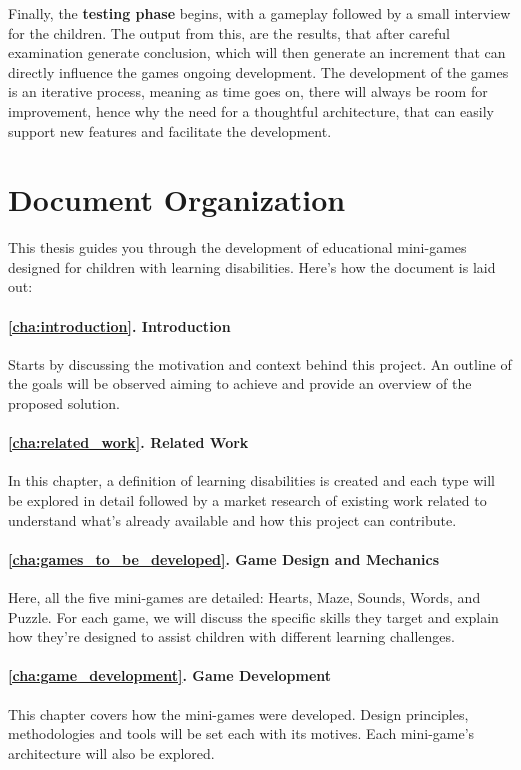 Finally, the \textbf{testing phase} begins, with a gameplay followed by a small interview for the children. The output from this, are the results, that after careful examination generate conclusion, which will then generate an increment that can directly influence the games ongoing development.
The development of the games is an iterative process, meaning as time goes on, there will always be room for improvement, hence why the need for a thoughtful architecture, that can easily support new features and facilitate the development.


\section{Document Organization}

This thesis guides you through the development of educational mini-games designed for children with learning disabilities. Here’s how the document is laid out:

\paragraph{\ref{cha:introduction}. Introduction} Starts by discussing the motivation and context behind this project. An outline of the goals will be observed aiming to achieve and provide an overview of the proposed solution.

\paragraph{\ref{cha:related_work}. Related Work} In this chapter, a definition of learning disabilities is created and each type will be explored in detail followed by a market research of existing work related to understand what’s already available and how this project can contribute.

\paragraph{\ref{cha:games_to_be_developed}. Game Design and Mechanics} Here, all the five mini-games are detailed: Hearts, Maze, Sounds, Words, and Puzzle. For each game, we will discuss the specific skills they target and explain how they’re designed to assist children with different learning challenges.

\paragraph{\ref{cha:game_development}. Game Development} This chapter covers how the mini-games were developed. Design principles, methodologies and tools will be set each with its motives. Each mini-game's architecture will also be explored.

